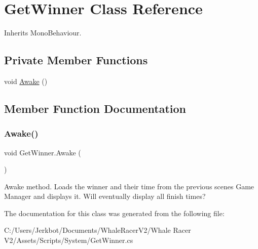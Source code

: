 \hypertarget{class_get_winner}{}\section{Get\+Winner Class Reference}
\label{class_get_winner}


Inherits Mono\+Behaviour.

\subsection*{Private Member Functions}
\begin{DoxyCompactItemize}
\item 
void \hyperlink{class_get_winner_a7139b18ae2039648bf5e60d0cb20c511}{Awake} ()
\end{DoxyCompactItemize}


\subsection{Member Function Documentation}
\mbox{\label{class_get_winner_a7139b18ae2039648bf5e60d0cb20c511}} 
\subsubsection{\texorpdfstring{Awake()}{Awake()}}
{\footnotesize\ttfamily void Get\+Winner.\+Awake (\begin{DoxyParamCaption}{ }\end{DoxyParamCaption})\hspace{0.3cm}{\ttfamily [private]}}



Awake method. Loads the winner and their time from the previous scene\textquotesingle{}s Game Manager and displays it. Will eventually display all finish times? 



The documentation for this class was generated from the following file\+:\begin{DoxyCompactItemize}
\item 
C\+:/\+Users/\+Jerkbot/\+Documents/\+Whale\+Racer\+V2/\+Whale Racer V2/\+Assets/\+Scripts/\+System/Get\+Winner.\+cs\end{DoxyCompactItemize}
